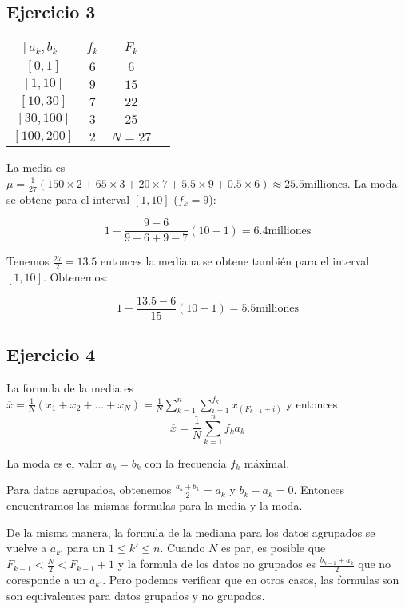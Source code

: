 \subsection{Ejercicio 3}

\begin{center}
\begin{tabular}{| c | c | c | c | }
  \hline
  $[a_k, b_k]$ & $f_k$ & $F_k$ \\
  \hline
  $[0,1]$ & $6$ & $6$\\
  \hline
  $[1,10]$ & $9$ & $15$ \\
  \hline
  $[10,30]$ & $7$ & $22$ \\
  \hline
  $[30,100]$ & $3$ & $25$ \\
  \hline
  $[100,200]$ & $2$ & $N=27$ \\
  \hline
\end{tabular}
\end{center}

La media es $\mu = \frac{1}{27} \left(
150 \times 2 + 65 \times 3 + 20 \times 7 + 5.5 \times 9 + 0.5 \times 6 \right)
\approx 25.5 \text{milliones}$. La moda se obtene para el interval $[1,10]$
($f_k=9$):

$$
1 + \frac{9-6}{9-6 + 9-7} \left(10-1\right) = 6.4 \text{milliones}
$$

Tenemos $\frac{27}{2} = 13.5$ entonces la mediana se obtene también para 
el interval $[1,10]$. Obtenemos:

$$
1 + \frac{13.5 - 6}{15} \left(10-1\right) = 5.5 \text{milliones}
$$

\subsection{Ejercicio 4}

La formula de la media es
$\overline{x} =
\frac{1}{N}{\left(x_1 + x_2 + \ldots + x_N\right)} =
\frac{1}{N} {\sum_{k=1}^n \sum_{i=1}^{f_k}  x_{(F_{k-1} + i)}}
$ y entonces
$$
\overline{x} =
\frac{1}{N} {\sum_{k=1}^n f_k a_k}
$$

La moda es el valor $a_k = b_k$ con la frecuencia $f_k$ máximal.

Para datos agrupados, obtenemos $\frac{a_k+b_k}{2} = a_k$ y
$b_k - a_k = 0$. Entonces encuentramos las mismas formulas para la media y la
moda. 

De la misma manera, la formula de la mediana para los datos agrupados se vuelve
a $a_{k'}$ para un $1 \leq k' \leq n$. Cuando $N$ es par, es posible que
$F_{k-1} < \frac{N}{2} < F_{k-1}+1$ y la formula de
los datos no grupados es $\frac{b_{k-1}+a_{k}}{2}$ que no coresponde a
un $a_{k'}$. Pero podemos verificar que en otros casos, las formulas son 
son equivalentes para datos grupados y no grupados.

